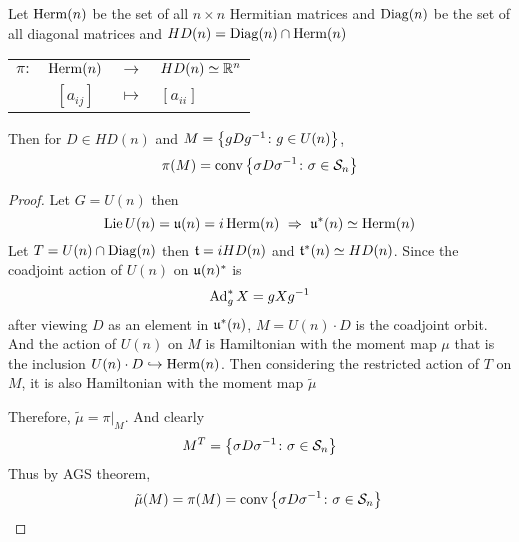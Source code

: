 \documentclass[a4paper,12pt]{article}
\begin{document}
	\begin{exam}
		Let $\operatorname{Herm}(n)$ be the set of all $n \times n$ Hermitian matrices and $\operatorname{Diag}(n)$ be the set of all diagonal matrices and $HD(n) =  \operatorname{Diag}(n) \cap \operatorname{Herm}(n)$
		\begin{center}
			\begin{tabular}{l c c l}
				$\pi \colon$ & $\operatorname{Herm}(n)$ & $\longrightarrow$ & $HD(n)   \simeq \mathbb{R}^n$ \\
				~ & $[a_{ij}]$ & $\longmapsto$ & $[a_{ii}]$
			\end{tabular}
		\end{center}
		Then for $D \in HD(n)$ and $M = \left\{gDg^{-1} \colon g \in U(n)\right\}$,
		\begin{equation*}
			\pi(M) = \operatorname{conv}\left\{\sigma D \sigma^{-1}  \colon \sigma \in \mathcal{S}_n\right\}
		\end{equation*}
		\begin{proof}
			Let $G = U(n)$ then
			\begin{equation*}
				\operatorname{Lie} U(n) = \mathfrak{u}(n) = i\operatorname{Herm}(n) ~\Rightarrow~ \mathfrak{u}^*(n) \simeq \operatorname{Herm}(n)
			\end{equation*}
			Let $T = U(n) \cap \operatorname{Diag}(n)$ then $\mathfrak{t} = iHD(n)$ and $\mathfrak{t}^*(n) \simeq HD(n)$. Since the coadjoint action of $U(n)$ on $\mathfrak{u}(n)^*$ is
			\begin{equation*}
				\operatorname{Ad}_g^*X = gXg^{-1}
			\end{equation*}
			after viewing $D$ as an element in $\mathfrak{u}^*(n)$, $M = U(n) \cdot D$ is the coadjoint orbit. And the action of $U(n)$ on $M$ is Hamiltonian with the moment map $\mu$ that is the inclusion $U(n) \cdot D \hookrightarrow \operatorname{Herm}(n)$. Then considering the restricted action of $T$ on $M$, it is also Hamiltonian with the moment map $\tilde{\mu}$
			\begin{center}
			\end{center}
			Therefore, $\tilde{\mu} = \left.\pi\right\lvert_M$. And clearly
			\begin{equation*}
				M^T = \left\{\sigma D \sigma^{-1}  \colon \sigma \in \mathcal{S}_n\right\}
			\end{equation*}
			Thus by AGS theorem,
			\begin{equation*}
				\tilde{\mu}(M) = \pi(M) = \operatorname{conv}\left\{\sigma D \sigma^{-1}  \colon \sigma \in \mathcal{S}_n\right\} \qedhere
			\end{equation*}
		\end{proof}
	\end{exam}
	
\end{document}
